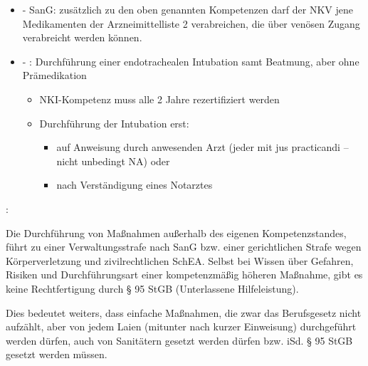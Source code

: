 \begin{itemize}
	Die  wird vom leitenden
		Arzt der Rettungsorganisation festgelegt und darf erst
		verabreicht werden:
			\begin{itemize}
		\item auf Anweisung durch anwesenden Arzt (jeder mit jus
		practicandi -- nicht unbedingt NA) oder
		\item
		nach Verständigung eines Notarztes.
	\end{itemize}
	\item 
	 -  SanG:
	zusätzlich zu den oben genannten Kompetenzen darf der NKV jene
	Medikamenten der Arzneimittelliste 2 verabreichen, die \"uber ven\"osen
	Zugang verabreicht werden k\"onnen.
	\item 	{} - :
	Durchf\"uhrung einer endotrachealen Intubation samt Beatmung, aber ohne
	Prämedikation
	\begin{itemize}
		\item {\mdseries
		NKI-Kompetenz muss alle 2 Jahre rezertifiziert werden}

		\item {\mdseries
		Durchf\"uhrung der Intubation erst:}

		\begin{itemize}
			\item {\mdseries
			auf Anweisung durch anwesenden Arzt (jeder mit jus practicandi -- nicht unbedingt NA) oder}

			\item {\mdseries
			nach Verständigung eines Notarztes }

		\end{itemize}
	\end{itemize}
\end{itemize}	
{\mdseries
{}:}

Die Durchf\"uhrung von Ma{\ss}nahmen au{\ss}erhalb des eigenen
Kompetenzstandes, f\"uhrt zu einer Verwaltungsstrafe nach SanG bzw.
einer gerichtlichen Strafe wegen K\"orperverletzung und
zivilrechtlichen SchEA. Selbst bei Wissen \"uber Gefahren, Risiken und
Durchf\"uhrungsart einer kompetenzmä{\ss}ig h\"oheren Ma{\ss}nahme,
gibt es keine Rechtfertigung durch {\S} 95 StGB (Unterlassene
Hilfeleistung).

Dies bedeutet weiters, dass einfache Ma{\ss}nahmen, die zwar das
Berufsgesetz nicht aufzählt, aber von jedem Laien (mitunter nach
kurzer Einweisung) durchgef\"uhrt werden d\"urfen, auch von
Sanitätern gesetzt werden d\"urfen bzw. iSd. {\S} 95 StGB gesetzt
werden m\"ussen.


